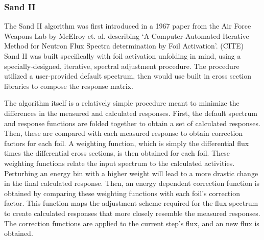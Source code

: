 \subsubsection{Sand II}

The Sand II algorithm was first introduced in a 1967 paper from the Air Force Weapons Lab by McElroy et. al. describing `A Computer-Automated Iterative Method for Neutron Flux Spectra determination by Foil Activation'. (CITE)
Sand II was built specifically with foil activation unfolding in mind, using a specially-designed, iterative, spectral adjustment procedure.
The procedure utilized a user-provided default spectrum, then would use built in cross section libraries to compose the response matrix.

The algorithm itself is a relatively simple procedure meant to minimize the differences in the measured and calculated responses.
First, the default spectrum and response functions are folded together to obtain a set of calculated responses.
Then, these are compared with each measured response to obtain correction factors for each foil.
A weighting function, which is simply the differential flux times the differential cross sections, is then obtained for each foil.
These weighting functions relate the input spectrum to the calculated activities.
Perturbing an energy bin with a higher weight will lead to a more drastic change in the final calculated response.
Then, an energy dependent correction function is obtained by comparing these weighting functions with each foil's correction factor.
This function maps the adjustment scheme required for the flux spectrum to create calculated responses that more closely resemble the measured responses.
The correction functions are applied to the current step's flux, and an new flux is obtained.


